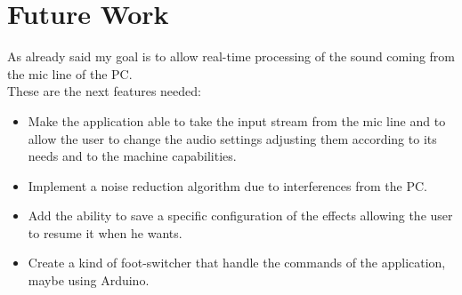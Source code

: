 \chapter{Future Work}

As already said my goal is to allow real-time processing of the sound
coming from the mic line of the PC.\\
These are the next features needed:
\begin{itemize}
  \item Make the application able to take the input stream from the mic
  line and to allow the user to change the audio settings adjusting them
  according to its needs and to the machine capabilities.
  \item Implement a noise reduction algorithm due to interferences
  from the PC.
  \item Add the ability to save a specific configuration of the effects 
  allowing the user to resume it when he wants.
  \item Create a kind of foot-switcher that handle the commands of the
  application, maybe using Arduino.
\end{itemize}
